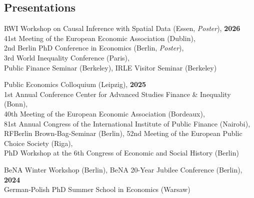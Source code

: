 \documentclass[margin, line]{res}
\newlength{\secvspace}
\newlength{\linevspace}
\begin{document}
\begin{resume}

\section{Presentations}
RWI Workshop on Causal Inference with Spatial Data (Essen, \textit{Poster}), \hfill{\bf 2026} \\
41st Meeting of the European Economic Association (Dublin), \\
2nd Berlin PhD Conference in Economics (Berlin, \textit{Poster}), \\
3rd World Inequality Conference (Paris), \\
Public Finance Seminar (Berkeley), IRLE Visitor Seminar (Berkeley)   \\
\vspace{\linevspace}

Public Economics Colloquium (Leipzig), \hfill{\bf 2025} \\
1st Annual Conference Center for Advanced Studies Finance \& Inequality (Bonn),  \\
40th Meeting of the European Economic Association (Bordeaux), \\
81st Annual Congress of the International Institute of Public Finance (Nairobi), \\
RFBerlin Brown-Bag-Seminar (Berlin), 52nd Meeting of the European Public Choice Society (Riga), \\
PhD Workshop at the 6th Congress of Economic and Social History (Berlin) \\
\vspace{\linevspace}

BeNA Winter Workshop (Berlin), BeNA 20-Year Jubilee Conference (Berlin),  \hfill{\bf 2024} \\
German-Polish PhD Summer School in Economics (Warsaw)

\vspace*{\secvspace}


\end{resume}
\end{document}
